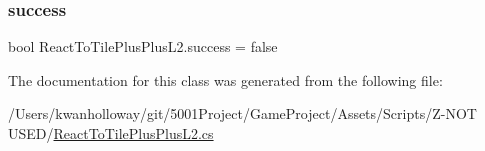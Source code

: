 \subsubsection{\texorpdfstring{success}{success}}
{\footnotesize\ttfamily bool React\+To\+Tile\+Plus\+Plus\+L2.\+success = false}



The documentation for this class was generated from the following file\+:\begin{DoxyCompactItemize}
\item 
/\+Users/kwanholloway/git/5001\+Project/\+Game\+Project/\+Assets/\+Scripts/\+Z-\/\+N\+O\+T U\+S\+E\+D/\hyperlink{_react_to_tile_plus_plus_l2_8cs}{React\+To\+Tile\+Plus\+Plus\+L2.\+cs}\end{DoxyCompactItemize}

